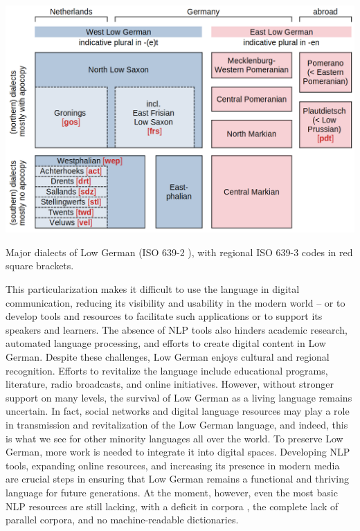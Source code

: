 \begin{table}
    \centering
    \includegraphics[width=1.0\linewidth]{img/dialects-and-iso632-codes.png}
    \caption{Major dialects of Low German (ISO 639-2 ), with regional ISO 639-3 codes in red square brackets.}
    \label{tab-dialects-and-isocodes}
\end{table}

This particularization makes it difficult to use the language in digital communication, reducing its visibility and usability in the modern world -- or to develop tools and resources to facilitate such applications or to support its speakers and learners. The absence of NLP tools also hinders academic research, automated language processing, and efforts to create digital content in Low German. Despite these challenges, Low German enjoys cultural and regional recognition. Efforts to revitalize the language include educational programs, literature, radio broadcasts, and online initiatives. However, without stronger support on many levels, the survival of Low German as a living language remains uncertain. In fact, social networks and digital language resources may play a role in transmission and revitalization of the Low German language, and indeed, this is what we see for other minority languages all over the world. To preserve Low German, more work is needed to integrate it into digital spaces. Developing NLP tools, expanding online resources, and increasing its presence in modern media are crucial steps in ensuring that Low German remains a functional and thriving language for future generations. At the moment, however, even the most basic NLP resources are still lacking, with a deficit in corpora \cite{siewert2021towards}, the complete lack of parallel corpora, and no machine-readable dictionaries. 

